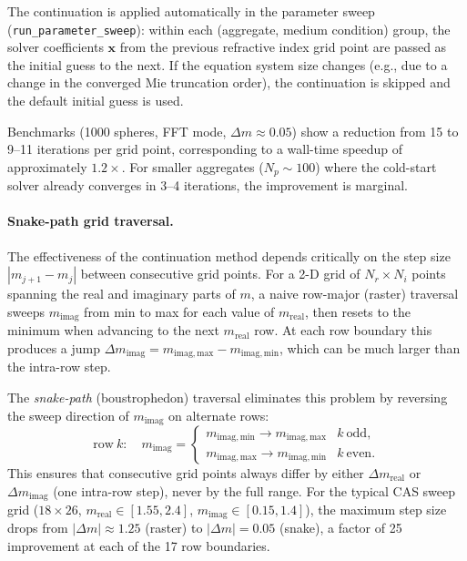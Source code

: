 \documentclass[11pt,a4paper]{article}
\begin{document}
The continuation is applied automatically in the parameter sweep (\texttt{run\_parameter\_sweep}): within each (aggregate, medium condition) group, the solver coefficients $\bm{x}$ from the previous refractive index grid point are passed as the initial guess to the next.  If the equation system size changes (e.g., due to a change in the converged Mie truncation order), the continuation is skipped and the default initial guess is used.

Benchmarks (1000 spheres, FFT mode, $\Delta m \approx 0.05$) show a reduction from 15 to 9--11 iterations per grid point, corresponding to a wall-time speedup of approximately $1.2\times$.  For smaller aggregates ($N_p \sim 100$) where the cold-start solver already converges in 3--4 iterations, the improvement is marginal.

\paragraph{Snake-path grid traversal.}
The effectiveness of the continuation method depends critically on the step size $|m_{j+1} - m_j|$ between consecutive grid points.
For a 2-D grid of $N_r \times N_i$ points spanning the real and imaginary parts of $m$, a naive row-major (raster) traversal sweeps $m_\mathrm{imag}$ from min to max for each value of $m_\mathrm{real}$, then resets to the minimum when advancing to the next $m_\mathrm{real}$ row.
At each row boundary this produces a jump $\Delta m_\mathrm{imag} = m_\mathrm{imag,max} - m_\mathrm{imag,min}$, which can be much larger than the intra-row step.

The \emph{snake-path} (boustrophedon) traversal eliminates this problem by reversing the sweep direction of $m_\mathrm{imag}$ on alternate rows:
\begin{equation*}
  \text{row}~k : \quad m_\mathrm{imag} = \begin{cases}
    m_\mathrm{imag,min} \to m_\mathrm{imag,max} & k~\text{odd}, \\
    m_\mathrm{imag,max} \to m_\mathrm{imag,min} & k~\text{even}.
  \end{cases}
\end{equation*}
This ensures that consecutive grid points always differ by either $\Delta m_\mathrm{real}$ or $\Delta m_\mathrm{imag}$ (one intra-row step), never by the full range.
For the typical CAS sweep grid ($18 \times 26$, $m_\mathrm{real} \in [1.55, 2.4]$, $m_\mathrm{imag} \in [0.15, 1.4]$), the maximum step size drops from $|{\Delta m}| \approx 1.25$ (raster) to $|{\Delta m}| = 0.05$ (snake), a factor of 25 improvement at each of the 17 row boundaries.
\end{document}
